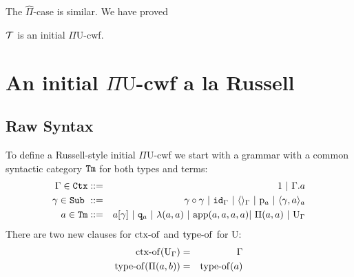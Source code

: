\documentclass{lmcs}
\def\UU{\mathrm{U}}
\def\Pihat{\hat{\Pi}}
\begin{document}
The $\Pihat$-case is similar. We have proved
\begin{thm}\label{theom:initial_cwf}
  ${\mathcal T}$ is an initial $\Pi\UU$-cwf.
\end{thm}

%

\section{An initial $\Pi \UU$-cwf a la Russell}

\subsection{Raw Syntax}
To define a Russell-style initial $\Pi\UU$-cwf we start with a grammar with a common syntactic category ${\tt Tm}$ for both types and terms:
\begin{eqnarray*}
\Gamma \in \RawCtx &::=& 1  \ |\ \Gamma.a\\
\gamma \in \RawSub \ &::=& \gamma \circ \gamma \ |\ \id_\Gamma \ |\ \langle\rangle_\Gamma \ |\ \p_{a} \ |\ \langle \gamma, a \rangle_a\\
a \in \RawTm &::=& a [\gamma] \ |\ \qI_a\  |\   \lambda(a,a) \ |\ 
\ap(a,a,a,a) |\  \Pi(a,a)  \ |\  \UU_\Gamma
\end{eqnarray*}
There are two new clauses for $\operatorname{ctx-of}$ and $\operatorname{type-of}$ for $\UU$:
\begin{eqnarray*}
\ctxof(\UU_\Gamma) &=& \Gamma\\
\typeof(\Pi(a,b))&=& \typeof(a)
\end{eqnarray*}
\end{document}

